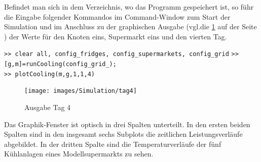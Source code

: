 Befindet man sich in dem Verzeichnis, wo das Programm gespeichert ist, so f\"uhr
die Eingabe folgender Kommandos im \matlab Command-Window zum Start der
Simulation und im Anschluss zu der graphischen Ausgabe (vgl.die \cref{fig:ausg}
auf der Seite \pageref{fig:ausg}) der Werte f\"ur den Knoten eins, Supermarkt
eins und den vierten Tag.

\noindent \lstinline{>> clear all, config_fridges, config_supermarkets, config_grid}
\noindent \lstinline{>> [g,m]=runCooling(config_grid_);}\\
\noindent \lstinline{>> plotCooling(m,g,1,1,4)}\\

\begin{figure}[h!]
\begin{center}
\texttt{[image: images/Simulation/tag4]}
\end{center}
\caption{Ausgabe Tag 4}
\label{fig:ausg}
\end{figure}
Das Graphik-Fenster ist optisch in drei Spalten unterteilt. In den ersten beiden
Spalten sind in den insgesamt sechs Subplots die zeitlichen Leistungsverl\"aufe
abgebildet. In der dritten Spalte sind die Temperaturverl\"aufe der f\"unf
K\"uhlanlagen eines Modellsupermarkts zu sehen.
